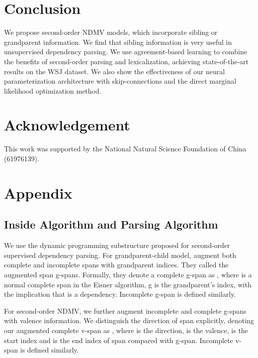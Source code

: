 \documentclass[11pt]{article}
\begin{document}
\section{Conclusion}
We propose second-order NDMV models, which incorporate sibling or grandparent information. We find that sibling information is very useful in unsupervised dependency parsing. We use agreement-based learning to combine the benefits of second-order parsing and lexicalization, achieving state-of-the-art results on the WSJ dataset. We also show the effectiveness of our neural parameterization architecture with skip-connections and the direct marginal likelihood optimization method.

\section*{Acknowledgement}
This work was supported by the National Natural Science Foundation of China (61976139).











\appendix
\section{Appendix}
\subsection{Inside Algorithm and Parsing Algorithm}
\label{intro2}

We use the dynamic programming substructure proposed for second-order supervised dependency parsing.  For grandparent-child model,  augment both complete and incomplete spans with grandparent indices. They called the augmented span g-spans. Formally, they denote a complete g-span as , where  is a normal complete span in the Eisner algorithm, g is the grandparent's index, with the implication that  is a dependency. Incomplete g-span is defined similarly. 

For second-order NDMV, we further augment incomplete and complete g-spans with valence information. We distinguish the direction of span explicitly, denoting our augmented complete v-span as , where  is the direction,  is the valence,  is the start index and  is the end index of span compared with g-span. Incomplete v-span is defined similarly. 
\end{document}
